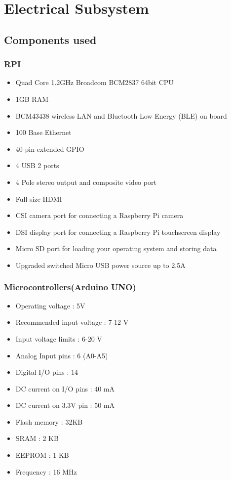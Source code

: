 \documentclass[11pt]{article}
\begin{document}
\pagebreak

\section{Electrical Subsystem}
\subsection{Components used}
\subsubsection{RPI}
\begin{itemize}
\item{Quad Core 1.2GHz Broadcom BCM2837 64bit CPU}
\item{1GB RAM}
\item{BCM43438 wireless LAN and Bluetooth Low Energy (BLE) on board}
\item{100 Base Ethernet}
\item{40-pin extended GPIO}
\item{4 USB 2 ports}
\item{4 Pole stereo output and composite video port}
\item{Full size HDMI}
\item{CSI camera port for connecting a Raspberry Pi camera}
\item{DSI display port for connecting a Raspberry Pi touchscreen display}
\item{Micro SD port for loading your operating system and storing data}
\item{Upgraded switched Micro USB power source up to 2.5A}
\end{itemize}
\subsubsection{Microcontrollers(Arduino UNO)}
\begin{itemize}
\item{Operating voltage : 5V}
\item{Recommended input voltage : 7-12 V}
\item{Input voltage limits : 6-20 V}
\item{Analog Input pins : 6 (A0-A5)}
\item{Digital I/O pins : 14 }
\item{DC current on I/O pins : 40 mA}
\item{DC current on 3.3V pin : 50 mA}
\item{Flash memory : 32KB}
\item{SRAM : 2 KB}
\item{EEPROM : 1 KB}
\item{Frequency : 16 MHz}
\end{itemize}
\end{document}

